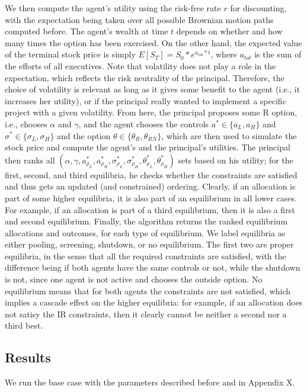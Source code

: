 We then compute the agent's utility using the risk-free rate $r$ for discounting, with the expectation being taken over all possible Brownian motion paths computed before. The agent's wealth at time $t$ depends on whether and how many times the option has been exercised. On the other hand, the expected value of the terminal stock price is simply $E[S_T] = S_0 * e^{a_{tot}*t}$, where $a_{tot}$ is the sum of the efforts of all executives. Note that volatility does not play a role in the expectation, which reflects the risk neutrality of the principal. Therefore, the choice of volatility is relevant as long as it gives some benefit to the agent (i.e., it increases her utility), or if the principal really wanted to implement a specific project with a given volatility.
From here, the principal proposes some R option, i.e., chooses $\alpha$ and $\gamma$, and the agent chooses the controls $a^* \in \{a_L, a_H\}$ and $\sigma^* \in \{\sigma_L, \sigma_H\}$ and the option $\theta \in \{ \theta_R, \theta_{RN} \}$, which are then used to simulate the stock price and compute the agent's and the principal's utilities. The principal then ranks all $(\alpha, \gamma, a^*_{\rho_L}, a^*_{\rho_H}, \sigma^*_{\rho_L}, \sigma^*_{\rho_H}, \theta^*_{\rho_L}, \theta^*_{\rho_H})$ sets based on his utility; for the first, second, and third equilibria, he checks whether the constraints are satisfied and thus gets an updated (and constrained) ordering. Clearly, if an allocation is part of some higher equilibria, it is also part of an equilibrium in all lower cases. For example, if an allocation is part of a third equilibrium, then it is also a first and second equilibrium. Finally, the algorithm returns the ranked equilibrium allocations and outcomes, for each type of equilibrium. We label equilibria as either pooling, screening, shutdown, or no equilibrium. The first two are proper equilibria, in the sense that all the required constraints are satisfied, with the difference being if both agents have the same controls or not, while the shutdown is not, since one agent is not active and chooses the outside option. No equilibrium means that for both agents the constraints are not satisfied, which implies a cascade effect on the higher equilibria: for example, if an allocation does not satisy the IR constraints, then it clearly cannot be neither a second nor a third best.


\subsection{Results} 
We run the base case with the parameters described before and in Appendix X. %


